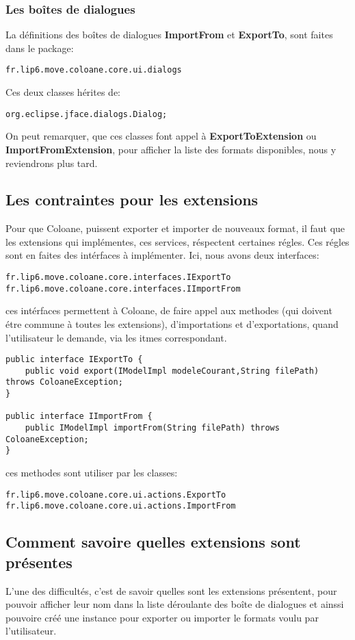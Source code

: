 \documentclass{article}
\begin{document}
\subsubsection{Les boîtes de dialogues}
La définitions des boîtes de dialogues \textbf{ImportFrom} et \textbf{ExportTo}, sont faites dans
le package: 
\begin{verbatim}
fr.lip6.move.coloane.core.ui.dialogs
\end{verbatim}
Ces deux classes hérites de:
\begin{verbatim}
org.eclipse.jface.dialogs.Dialog;
\end{verbatim}
On peut remarquer, que ces classes font appel à \textbf{ExportToExtension} ou \textbf{ImportFromExtension}, 
pour afficher la liste des formats disponibles, nous y reviendrons plus tard.

\subsection{Les contraintes pour les extensions}
Pour que Coloane, puissent exporter et importer de nouveaux format, il faut que les extensions qui implémentes, 
ces services, réspectent certaines régles. Ces régles sont en faites des intérfaces à implémenter. Ici, nous avons 
deux interfaces:
\begin{verbatim}
fr.lip6.move.coloane.core.interfaces.IExportTo
fr.lip6.move.coloane.core.interfaces.IImportFrom
\end{verbatim}
ces intérfaces permettent à Coloane, de faire appel aux methodes (qui doivent étre commune à toutes les extensions), 
d'importations et d'exportations, quand l'utilisateur le demande, via les itmes correspondant.
\begin{verbatim}
public interface IExportTo {
	public void export(IModelImpl modeleCourant,String filePath) throws ColoaneException;
}

public interface IImportFrom {
	public IModelImpl importFrom(String filePath) throws ColoaneException;
}
\end{verbatim}
ces methodes sont utiliser par les classes:
\begin{verbatim}
fr.lip6.move.coloane.core.ui.actions.ExportTo
fr.lip6.move.coloane.core.ui.actions.ImportFrom
\end{verbatim}

\subsection{Comment savoire quelles extensions sont présentes}
L'une des difficultés, c'est de savoir quelles sont les extensions présentent, 
pour pouvoir afficher leur nom dans la liste déroulante des boîte de dialogues et ainssi pouvoire créé une 
instance pour exporter ou importer le formats voulu par l'utilisateur.
\end{document}
